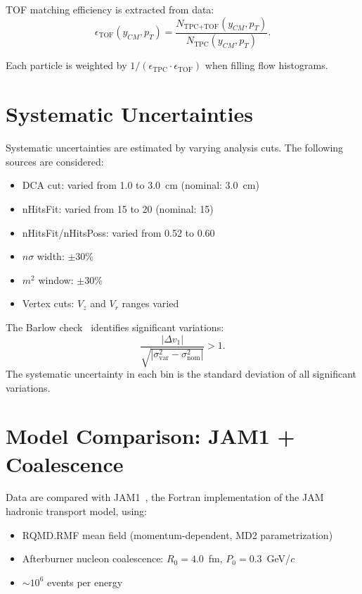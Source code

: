 \documentclass[aps,prc,preprint,superscriptaddress,nofootinbib]{revtex4-2}
\begin{document}
TOF matching efficiency is extracted from data:
\begin{equation}
    \epsilon_{\text{TOF}}(y_{CM}, p_T) = \frac{N_{\text{TPC+TOF}}(y_{CM}, p_T)}{N_{\text{TPC}}(y_{CM}, p_T)}.
\end{equation}

Each particle is weighted by $1/(\epsilon_{\text{TPC}} \cdot \epsilon_{\text{TOF}})$ when filling flow histograms.

\section{Systematic Uncertainties}
\label{sec:systematics}

Systematic uncertainties are estimated by varying analysis cuts. The following sources are considered:

\begin{itemize}
    \item DCA cut: varied from 1.0 to 3.0~cm (nominal: 3.0~cm)
    \item nHitsFit: varied from 15 to 20 (nominal: 15)
    \item nHitsFit/nHitsPoss: varied from 0.52 to 0.60
    \item $n\sigma$ width: $\pm 30\%$
    \item $m^2$ window: $\pm 30\%$
    \item Vertex cuts: $V_z$ and $V_r$ ranges varied
\end{itemize}

The Barlow check~\cite{Barlow:2002yb} identifies significant variations:
\begin{equation}
    \frac{|\Delta v_1|}{\sqrt{|\sigma_{\text{var}}^2 - \sigma_{\text{nom}}^2|}} > 1.
    \label{eq:barlow}
\end{equation}
The systematic uncertainty in each bin is the standard deviation of all significant variations.

\section{Model Comparison: JAM1 + Coalescence}
\label{sec:model}

Data are compared with JAM1~\cite{Nara:2019qfd}, the Fortran implementation of the JAM hadronic transport model, using:
\begin{itemize}
    \item RQMD.RMF mean field (momentum-dependent, MD2 parametrization)
    \item Afterburner nucleon coalescence: $R_0 = 4.0$~fm, $P_0 = 0.3$~GeV/$c$
    \item $\sim 10^6$ events per energy
\end{itemize}
\end{document}
